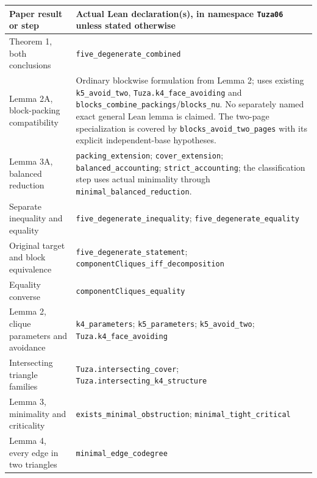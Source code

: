\documentclass[11pt]{article}
\begin{document}
{\def\LTcaptype{none} %
{\small\begin{longtable}[]{@{}
  >{\raggedright\arraybackslash}p{}
  >{\raggedright\arraybackslash}p{}@{}}
\toprule\noalign{}
\begin{minipage}[b]{\linewidth}\raggedright
Paper result or step
\end{minipage} & \begin{minipage}[b]{\linewidth}\raggedright
Actual Lean declaration(s), in namespace \texttt{Tuza06} unless stated
otherwise
\end{minipage} \\
\midrule\noalign{}
\endhead
\bottomrule\noalign{}
\endlastfoot
Theorem 1, both conclusions & \texttt{five\_degenerate\_combined} \\
Lemma 2A, block-packing compatibility & Ordinary blockwise formulation
from Lemma 2; uses existing \texttt{k5\_avoid\_two},
\texttt{Tuza.k4\_face\_avoiding} and
\texttt{blocks\_combine\_packings}/\texttt{blocks\_nu}. No separately
named exact general Lean lemma is claimed. The two-page specialization
is covered by \texttt{blocks\_avoid\_two\_pages} with its explicit
independent-base hypotheses. \\
Lemma 3A, balanced reduction & \texttt{packing\_extension};
\texttt{cover\_extension}; \texttt{balanced\_accounting};
\texttt{strict\_accounting}; the classification step uses actual
minimality through \texttt{minimal\_balanced\_reduction}. \\
Separate inequality and equality &
\texttt{five\_degenerate\_inequality};
\texttt{five\_degenerate\_equality} \\
Original target and block equivalence &
\texttt{five\_degenerate\_statement};
\texttt{componentCliques\_iff\_decomposition} \\
Equality converse & \texttt{componentCliques\_equality} \\
Lemma 2, clique parameters and avoidance & \texttt{k4\_parameters};
\texttt{k5\_parameters}; \texttt{k5\_avoid\_two};
\texttt{Tuza.k4\_face\_avoiding} \\
Intersecting triangle families & \texttt{Tuza.intersecting\_cover};
\texttt{Tuza.intersecting\_k4\_structure} \\
Lemma 3, minimality and criticality &
\texttt{exists\_minimal\_obstruction};
\texttt{minimal\_tight\_critical} \\
Lemma 4, every edge in two triangles &
\texttt{minimal\_edge\_codegree} \\

\end{longtable}}}
\end{document}
